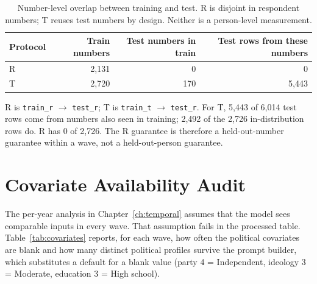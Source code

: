\begin{table}[h]
\centering
\small
\caption{Number-level overlap between training and test. R is disjoint in
respondent numbers; T reuses test numbers by design. Neither is a person-level
measurement.}
\label{tab:number_overlap}
\begin{tabular}{lrrr}
\toprule
Protocol & Train numbers & Test numbers in train & Test rows from these numbers \\
\midrule
R & 2,131 & 0 & 0 \\
T & 2,720 & 170 & 5,443 \\
\bottomrule
\end{tabular}
\par\smallskip\footnotesize
R is \texttt{train\_r} $\rightarrow$ \texttt{test\_r}; T is \texttt{train\_t}
$\rightarrow$ \texttt{test\_r}. For T, 5,443 of 6,014 test rows come from numbers
also seen in training; 2,492 of the 2,726 in-distribution rows do. R has 0 of
2,726. The R guarantee is therefore a held-out-number guarantee within a wave,
not a held-out-person guarantee.
\end{table}

\section{Covariate Availability Audit}
\label{app:covariates}

The per-year analysis in Chapter~\ref{ch:temporal} assumes that the model sees
comparable inputs in every wave. That assumption fails in the processed table. Table~\ref{tab:covariates}
reports, for each wave, how often the political covariates are blank and how many
distinct political profiles survive the prompt builder, which substitutes a
default for a blank value (party 4 = Independent, ideology 3 = Moderate,
education 3 = High school).

